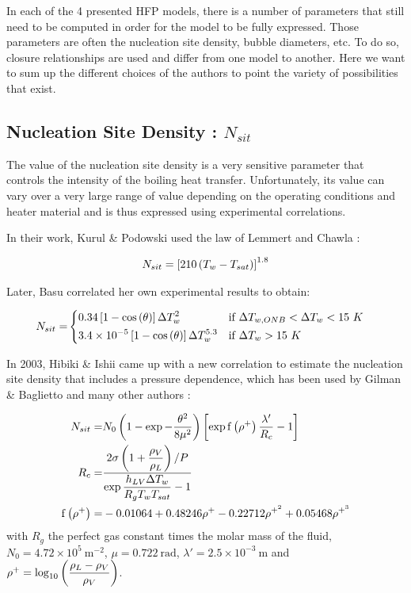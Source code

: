 In each of the 4 presented HFP models, there is a number of parameters that still need to be computed in order for the model to be fully expressed. Those parameters are often the nucleation site density, bubble diameters, etc. To do so, closure relationships are used and differ from one model to another. Here we want to sum up the different choices of the authors to point the variety of possibilities that exist.

\subsection{Nucleation Site Density : $N_{sit}$}

The value of the nucleation site density is a very sensitive parameter that controls the intensity of the boiling heat transfer. Unfortunately, its value can vary over a very large range of value depending on the operating conditions and heater material and is thus expressed using experimental correlations.

In their work, Kurul \& Podowski used the law of Lemmert and Chawla \cite{Lemmert}:

\begin{align}
N_{sit}=\left[ 210\left( T_{w}-T_{sat} \right) \right]^{1.8}
\end{align}


Later, Basu \cite{Basu} correlated her own experimental results to obtain:

\begin{align}
N_{sit}=&
\begin{dcases}
0.34\left[ 1-\mathrm{cos}\left( \theta \right) \right]\Delta T_{w}^{2} & \text{if } \Delta T_{w,ONB}<\Delta T_{w} < 15\ K\\
3.4\times 10^{-5}\left[ 1-\mathrm{cos}\left( \theta \right) \right]\Delta T_{w}^{5.3} & \text{if } \Delta T_{w} > 15\ K
\end{dcases}
\end{align}

In 2003, Hibiki \& Ishii \cite{HI} came up with a new correlation to estimate the nucleation site density that includes a pressure dependence, which has been used by Gilman \& Baglietto \cite{Gilman} and many other authors \cite{HI_others}:

\begin{align}
N_{sit} =& N_{0}\parth{1-\exp{-\dfrac{\theta^{2}}{8\mu^{2}} } }\crocht{\exp{ \mathrm{f}\parth{\rho^{+}}\dfrac{\lambda '}{R_{c}} } -1}\\
%
R_{c} =& \dfrac{2\sigma\parth{1+\dfrac{\rho_{V}}{\rho_{L}}} / P }{\exp{\dfrac{h_{LV} \Delta T_{w}}{R_{g}T_{w}T_{sat}} } -1}\\
%
\mathrm{f}\parth{\rho^{+}} =& -0.01064 + 0.48246\rho^{+} - 0.22712 \rho^{+^{2}} + 0.05468 \rho^{+^{3}}
\end{align}
with $R_{g}$ the perfect gas constant times the molar mass of the fluid,  $N_{0}=4.72\times 10^{5}\ \mathrm{m}^{-2}$, $\mu = 0.722\ \mathrm{rad}$, $\lambda ' = 2.5 \times 10^{-3} \ \mathrm{m}$ and $\rho^{+}=\mathrm{log}_{10}\left( \dfrac{\rho_{L}-\rho_{V}}{\rho_{V}} \right)$.

